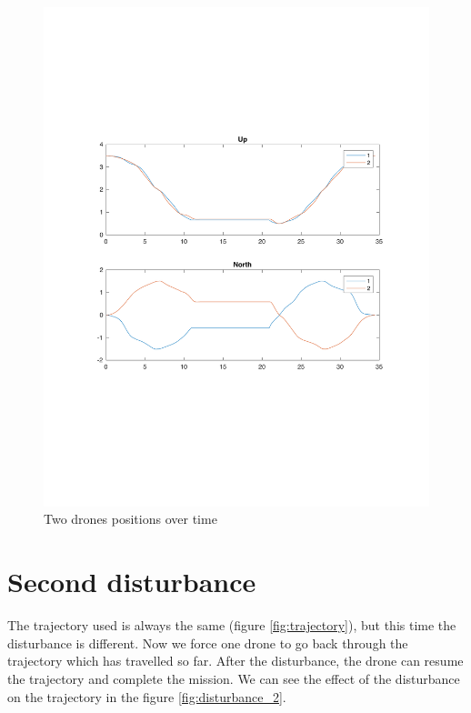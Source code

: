 \begin{figure}[h]
\centering
\includegraphics[width=1.0\textwidth]{chapters/chapter-04/figures/overlapped_1.pdf}
\caption{Two drones positions over time}
\label{fig:overlapped_1}
\end{figure}


\section{Second disturbance}
The trajectory used is always the same (figure \ref{fig:trajectory}), but this time
the disturbance is different. Now we force one drone to go back through the trajectory
which has travelled so far.
After the disturbance, the drone can resume the trajectory and complete the mission.
We can see the effect of the disturbance on the trajectory in the figure \ref{fig:disturbance_2}.

